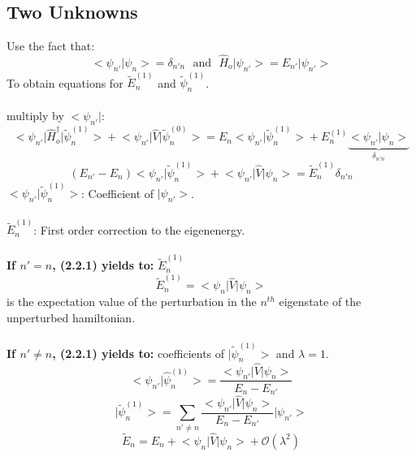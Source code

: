 \documentclass[12pt,fancychapters]{report}
\numberwithin{equation}{section}
\begin{document}
\subsection{Two Unknowns}
Use the fact that:
\[\big< \psi_{n'} \big| \psi_n\big> = \delta_{n'n}\,\,\,\,\text{and}\,\,\,\,\hat{H}_o \big|\psi_{n'}
\big> = E_{n'} \big | \psi_{n'} \big>\]
To obtain equations for $\tilde{E}^{(1)}_n$ and $\tilde{\psi}^{(1)}_n$.\\
\\
multiply by $\big< \psi_{n'} \big|$: 
\begin{equation*}
	\big< \psi_{n'} \big|\hat{H}^\dag_o \big|\tilde{\psi}^{(1)}_n \big> + 
	\big< \psi_{n'} \big|\hat{V}\big| \tilde{\psi}^{(0)}_n \big> = 
	E_n \big< \psi_{n'} \big|\tilde{\psi}^{(1)}_n \big> + E^{(1)}_n \underbrace{\big< \psi_{n'}
	\big|\psi_n \big>}_{\delta_{n'n}} 
\end{equation*}
\begin{equation}
	\left(E_{n'} - E_n\right)\big< \psi_{n'} \big|\tilde{\psi}^{(1)}_n \big> +
	\big< \psi_{n'} \big|\hat{V}\big| \psi_n \big> = \tilde{E}^{(1)}_n \delta_{n'n}
\end{equation}
$\big< \psi_{n'} \big|\tilde{\psi}^{(1)}_n \big>  $: Coefficient of $\big|\psi_{n'} \big>$.\\
\\
$\tilde{E}^{(1)}_n $: First order correction to the eigenenergy.\\
\\
\textbf{If $n'=n$, (2.2.1) yields to:} $\tilde{E}^{{(1)}}_n$ 
\begin{equation*}
	\boxed{\tilde{E}^{(1)}_n =	\big< \psi_{n} \big|\hat{V}\big| \psi_n \big>  }
\end{equation*}
is the expectation value of the perturbation in the $n^{th}$ eigenstate of the unperturbed hamiltonian.\\
\\
\textbf{If $n'\neq n$, (2.2.1) yields to:} coefficients of $\big | \tilde{\psi}^{(1)}_n\big>$ and $\lambda = 1$.
\begin{equation*}
	\big < \psi_{n'} |\hat{\psi}^{(1)}_n \big> = \frac{\big< \psi_{n'}\big|\hat{V}\big|\psi_n
	\big>}{E_n - E_{n'}}
\end{equation*}
\begin{equation*}
	\big|\tilde{\psi}^{(1)}_n \big> = \sum_{n' \neq n}
	\frac{\big< \psi_{n'}\big|\hat{V}\big|\psi_n\big>}{E_n - E_{n'}}\big|\psi_{n'}\big>
\end{equation*}
\begin{equation*}
	\tilde{E}_n = E_n +\big< \psi_{n}\big|\hat{V}\big|\psi_n\big> + \mathcal{O}(\lambda^2) 
\end{equation*}
\end{document}
